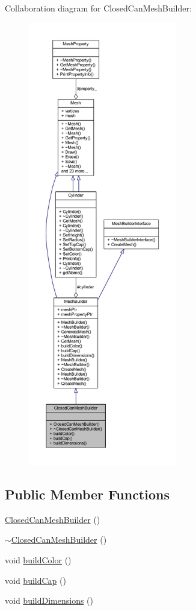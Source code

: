 Collaboration diagram for Closed\+Can\+Mesh\+Builder\+:\nopagebreak
\begin{figure}[H]
\begin{center}
\leavevmode
\includegraphics[height=550pt]{class_closed_can_mesh_builder__coll__graph}
\end{center}
\end{figure}
\subsection*{Public Member Functions}
\begin{DoxyCompactItemize}
\item 
\mbox{\hyperlink{class_closed_can_mesh_builder_ad8b7ef135bd9e0387dc59658fc66fe97}{Closed\+Can\+Mesh\+Builder}} ()
\item 
\mbox{\hyperlink{class_closed_can_mesh_builder_a7c400fe6752eaf7dcf578de0542bcdb6}{$\sim$\+Closed\+Can\+Mesh\+Builder}} ()
\item 
void \mbox{\hyperlink{class_closed_can_mesh_builder_ae99058cb912a5d9e1f34e49241f4c8c7}{build\+Color}} ()
\item 
void \mbox{\hyperlink{class_closed_can_mesh_builder_a6fd7852b01e6afc04346f80a5f2f4459}{build\+Cap}} ()
\item 
void \mbox{\hyperlink{class_closed_can_mesh_builder_a5d9a174577e0957f768300b32fd367cf}{build\+Dimensions}} ()
\end{DoxyCompactItemize}
